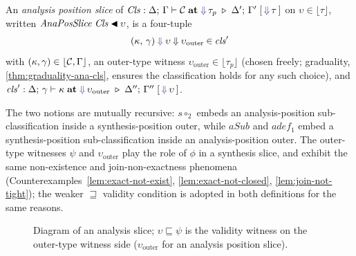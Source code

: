 \begin{definition}
\label{def:ana-pos-slice}
An \textit{analysis position slice} of $\mathit{Cls} : \ctxclass{\C}{{\color{BlueViolet}\Downarrow}\,\tau_p}{\Delta';\,\Gamma'}{{\color{BlueViolet}\Downarrow}\,\tau}$ on $\upsilon \in \lfloor\tau\rfloor$, written $\mathit{AnaPosSlice}\;\mathit{Cls} \mathbin{\blacktriangleleft} \upsilon$, is a four-tuple
\[ (\kappa,\,\gamma) \mathbin{{\color{BlueViolet}\Downarrow}} \upsilon \mathbin{\Downarrow} \upsilon_{\mathrm{outer}} \mathbin{\in} \mathit{cls}' \]
with $(\kappa, \gamma) \in \lfloor\mathcal{C}, \Gamma\rfloor$, an outer-type witness $\upsilon_{\mathrm{outer}} \in \lfloor\tau_p\rfloor$ (chosen freely; graduality, \cref{thm:graduality-ana-cls}, ensures the classification holds for any such choice), and $\mathit{cls}' : \ctxclass[\Delta;\,\gamma]{\kappa}{{\color{BlueViolet}\Downarrow}\,\upsilon_{\mathrm{outer}}}{\Delta'';\,\Gamma''}{{\color{BlueViolet}\Downarrow}\,\upsilon}$.
\end{definition}

The two notions are mutually recursive: $s\circ_2$ embeds an analysis-position sub-classification inside a synthesis-position outer, while $aSub$ and $adef_1$ embed a synthesis-position sub-classification inside an analysis-position outer. The outer-type witnesses $\psi$ and $\upsilon_{\mathrm{outer}}$ play the role of $\phi$ in a synthesis slice, and exhibit the same non-existence and join-non-exactness phenomena (Counterexamples~\ref{lem:exact-not-exist}, \ref{lem:exact-not-closed}, \ref{lem:join-not-tight}); the weaker $\sqsupseteq$ validity condition is adopted in both definitions for the same reasons.

\begin{figure}[t]
\centering
{}
\caption{Diagram of an analysis slice; $\upsilon \sqsubseteq \psi$ is the validity witness on the outer-type witness side ($\upsilon_{\mathrm{outer}}$ for an analysis position slice).}
\label{fig:ana-fundamental-triangle}
\end{figure}

